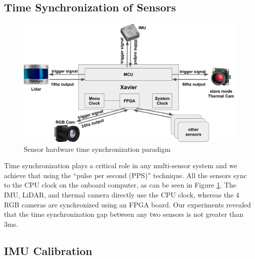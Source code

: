 \documentclass[10pt,twocolumn,letterpaper]{article}
\begin{document}
\subsection{Time Synchronization of Sensors}

\begin{figure}[!ht]
    \centering
    \includegraphics[width=1\linewidth]{figure/sync_pic.png}
    \caption{Sensor hardware time synchronization paradigm}
    \label{fig:synchronization}
\end{figure}


Time synchronization plays a critical role in any multi-sensor system and we achieve that using the ``pulse per second (PPS)'' technique. All the sensors sync to the CPU clock on the onboard computer, as can be seen in Figure \ref{fig:synchronization}. The IMU, LiDAR, and thermal camera directly use the CPU clock, whereas the 4 RGB cameras are synchronized using an FPGA board. Our experiments revealed that the time synchronization gap between any two sensors is not greater than 3ms.




\subsection{IMU Calibration}
\end{document}
